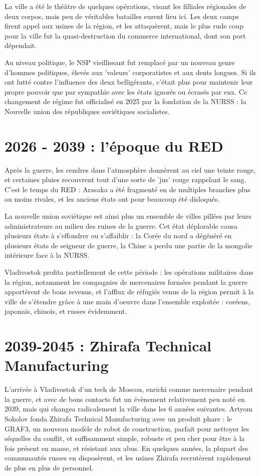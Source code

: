 \documentclass[10pt,a4paper]{book}
\begin{document}
La ville a été le théâtre de quelques opérations, visant les filliales régionales de deux corpos, mais peu de véritables batailles eurent lieu ici. Les deux camps firent appel aux usines de la région, et les attaquèrent, mais le plus rude coup pour la ville fut la quasi-destruction du commerce international, dont son port dépendait.

Au niveau politique, le NSP vieillissant fut remplacé par un nouveau genre d'hommes politiques, élevés aux 'valeurs' corporatistes et aux dents longues. Si ils ont lutté contre l'influence des deux belligérants, c'était plus pour maintenir leur propre pouvoir que par sympathie avec les états ignorés ou écrasés par eux. Ce changement de régime fut officialisé en 2025 par la fondation de la NURSS : la Nouvelle union des républiques soviétiques socialistes.
\section{2026 - 2039 : l'époque du RED}
Après la guerre, les cendres dans l'atmosphère donnèrent au ciel une teinte rouge, et certaines pluies recouvrent tout d'une sorte de 'jus' rouge rappelant le sang. C'est le temps du RED : Arasaka a été fragmenté en de multiples branches plus ou moins rivales, et les anciens états ont pour beaucoup été disloqués.

La nouvelle union soviétique est ainsi plus un ensemble de villes pillées par leurs administrateurs au milieu des ruines de la guerre. Cet état déplorable causa plusieurs états à s'effondrer ou s'affaiblir : la Corée du nord a dégénéré en plusieurs états de seigneur de guerre, la Chine a perdu une partie de la mongolie intérieure face à la NURSS.

Vladivostok profita partiellement de cette période : les opérations militaires dans la région, notamment les compagnies de mercenaires formées pendant la guerre apportèrent de bons revenus, et l'afflux de réfugiés venus de la région permit à la ville de s'étendre grâce à une main d'oeuvre dans l'ensemble exploitée : coréens, japonais, chinois, et russes évidemment.
\section{2039-2045 : Zhirafa Technical Manufacturing}
L'arrivée à Vladivostok d'un tech de Moscou, enrichi comme mercenaire pendant la guerre, et avec de bons contacts fut un évènement relativement peu noté en 2039, mais qui changea radicalement la ville dans les 6 années suivantes. Artyom Sokolov fonda Zhirafa Technical Manufacturing avec un produit phare : le GRAF3, un nouveau modèle de robot de construction, parfait pour nettoyer les séquelles du conflit, et suffisamment simple, robuste et peu cher pour être à la fois présent en masse, et résistant aux abus. En quelques années, la plupart des communautés russes en disposèrent, et les usines Zhirafa recrutèrent rapidement de plus en plus de personnel. 
\end{document}
